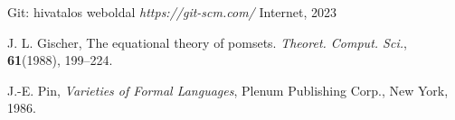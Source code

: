 \documentclass[12pt, a4paper]{report}
\theoremstyle{definition}
\begin{document}
\begin{thebibliography}{9}
		Git: hivatalos weboldal
		\emph{https://git-scm.com/}
		Internet, 2023
		

		
		J. L. Gischer,
		The equational theory of pomsets.
		\emph{Theoret. Comput. Sci.}, \textbf{61}(1988), 199--224.
		
		J.-E. Pin,
		\emph{Varieties of Formal Languages},
		Plenum Publishing Corp., New York, 1986.
		
		
		
		
		
	\end{thebibliography}
	
	
	
	
\end{document}
